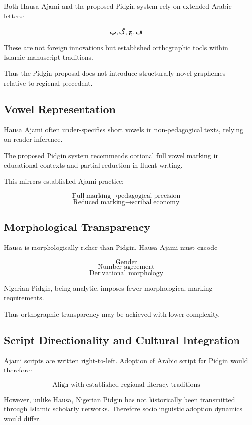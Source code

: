 \documentclass[12pt]{article}
\begin{document}
Both Hausa Ajami and the proposed Pidgin system rely on extended Arabic letters:

\[
پ, گ, چ, ڤ
\]

These are not foreign innovations but established orthographic tools within Islamic manuscript traditions.

Thus the Pidgin proposal does not introduce structurally novel graphemes relative to regional precedent.

\subsection{Vowel Representation}

Hausa Ajami often under-specifies short vowels in non-pedagogical texts, relying on reader inference.

The proposed Pidgin system recommends optional full vowel marking in educational contexts and partial reduction in fluent writing.

This mirrors established Ajami practice:

\[
\text{Full marking} \rightarrow \text{pedagogical precision}
\]
\[
\text{Reduced marking} \rightarrow \text{scribal economy}
\]

\subsection{Morphological Transparency}

Hausa is morphologically richer than Pidgin. Hausa Ajami must encode:

\[
\text{Gender}
\]
\[
\text{Number agreement}
\]
\[
\text{Derivational morphology}
\]

Nigerian Pidgin, being analytic, imposes fewer morphological marking requirements.

Thus orthographic transparency may be achieved with lower complexity.

\subsection{Script Directionality and Cultural Integration}

Ajami scripts are written right-to-left. Adoption of Arabic script for Pidgin would therefore:

\[
\text{Align with established regional literacy traditions}
\]

However, unlike Hausa, Nigerian Pidgin has not historically been transmitted through Islamic scholarly networks. Therefore sociolinguistic adoption dynamics would differ.
\end{document}

